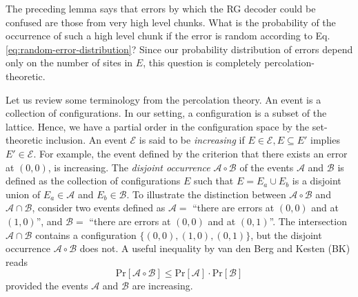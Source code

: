 \noindent
The preceding lemma says that errors by which the RG decoder could be confused are those from very high level chunks. What is the probability of the occurrence of such a high level chunk if the error is random according to Eq.\eqref{eq:random-error-distribution}? Since our probability distribution of errors depend only on the number of sites in $E$, this question is completely percolation-theoretic.

Let us review some terminology from the percolation theory\cite{Grimmett1999Percolation}. An event is a collection of configurations. In our setting, a configuration is a subset of the lattice. Hence, we have a partial order in the configuration space by the set-theoretic inclusion. An event $\mathcal E$ is said to be \emph{increasing} if $E \in \mathcal{E}, E \subseteq E'$ implies $E' \in \mathcal{E}$. For example, the event defined by the criterion that there exists an error at $(0,0)$, is increasing.
The \emph{disjoint occurrence} $\mathcal A \circ \mathcal B$ of the events $\mathcal A$ and $\mathcal B$ is defined as the collection of configurations $E$ such that $E = E_a \cup E_b$ is a disjoint union of $E_a \in \mathcal A$ and $E_b \in \mathcal B$. To illustrate the distinction between $\mathcal A \circ \mathcal B$ and $\mathcal A \cap \mathcal B$, consider two events defined as $\mathcal A = $ ``there are errors at $(0,0)$ and at $(1,0)$'', and $\mathcal B = $ ``there are errors at $(0,0)$ and at $(0,1)$''. The intersection $\mathcal A \cap \mathcal B$ contains a configuration $\{ (0,0),(1,0),(0,1) \}$, but the disjoint occurrence $\mathcal A \circ \mathcal B$ does not. A useful inequality by van den Berg and Kesten (BK) reads \cite{BergKesten1985, Grimmett1999Percolation}
\begin{equation}
 \mathrm{Pr}[ \mathcal A \circ \mathcal B ] \le \mathrm{Pr}[ \mathcal A ] \cdot \mathrm{Pr}[ \mathcal B]
\label{eq:BK-inequality}
\end{equation}
provided the events $\mathcal A$ and $\mathcal B$ are increasing.

